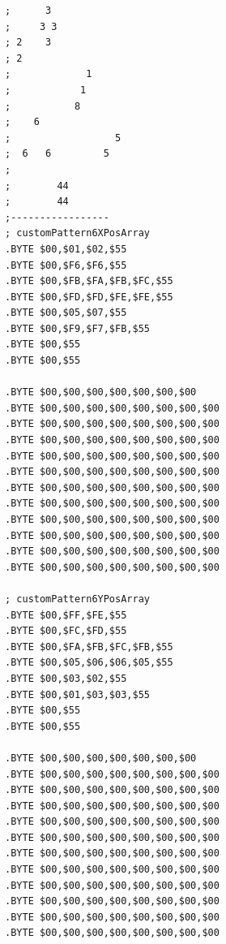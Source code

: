 \begin{minipage}[b]{0.33\linewidth}
\begin{lrbox}{\mybox}%
\begin{lstlisting}[basicstyle=\ttfamily\tiny]
;      3            
;     3 3           
; 2    3            
; 2                 
;             1     
;            1      
;           8       
;    6              
;                  5
;  6   6         5  
;                   
;        44         
;        44         
;-----------------
; customPattern6XPosArray
.BYTE $00,$01,$02,$55
.BYTE $00,$F6,$F6,$55
.BYTE $00,$FB,$FA,$FB,$FC,$55
.BYTE $00,$FD,$FD,$FE,$FE,$55
.BYTE $00,$05,$07,$55
.BYTE $00,$F9,$F7,$FB,$55
.BYTE $00,$55
.BYTE $00,$55

.BYTE $00,$00,$00,$00,$00,$00,$00
.BYTE $00,$00,$00,$00,$00,$00,$00,$00
.BYTE $00,$00,$00,$00,$00,$00,$00,$00
.BYTE $00,$00,$00,$00,$00,$00,$00,$00
.BYTE $00,$00,$00,$00,$00,$00,$00,$00
.BYTE $00,$00,$00,$00,$00,$00,$00,$00
.BYTE $00,$00,$00,$00,$00,$00,$00,$00
.BYTE $00,$00,$00,$00,$00,$00,$00,$00
.BYTE $00,$00,$00,$00,$00,$00,$00,$00
.BYTE $00,$00,$00,$00,$00,$00,$00,$00
.BYTE $00,$00,$00,$00,$00,$00,$00,$00
.BYTE $00,$00,$00,$00,$00,$00,$00,$00

; customPattern6YPosArray
.BYTE $00,$FF,$FE,$55
.BYTE $00,$FC,$FD,$55
.BYTE $00,$FA,$FB,$FC,$FB,$55
.BYTE $00,$05,$06,$06,$05,$55
.BYTE $00,$03,$02,$55
.BYTE $00,$01,$03,$03,$55
.BYTE $00,$55
.BYTE $00,$55

.BYTE $00,$00,$00,$00,$00,$00,$00
.BYTE $00,$00,$00,$00,$00,$00,$00,$00
.BYTE $00,$00,$00,$00,$00,$00,$00,$00
.BYTE $00,$00,$00,$00,$00,$00,$00,$00
.BYTE $00,$00,$00,$00,$00,$00,$00,$00
.BYTE $00,$00,$00,$00,$00,$00,$00,$00
.BYTE $00,$00,$00,$00,$00,$00,$00,$00
.BYTE $00,$00,$00,$00,$00,$00,$00,$00
.BYTE $00,$00,$00,$00,$00,$00,$00,$00
.BYTE $00,$00,$00,$00,$00,$00,$00,$00
.BYTE $00,$00,$00,$00,$00,$00,$00,$00
.BYTE $00,$00,$00,$00,$00,$00,$00,$00
\end{lstlisting}
\end{lrbox}%
\scalebox{0.8}{\usebox{\mybox}}
\end{minipage}

